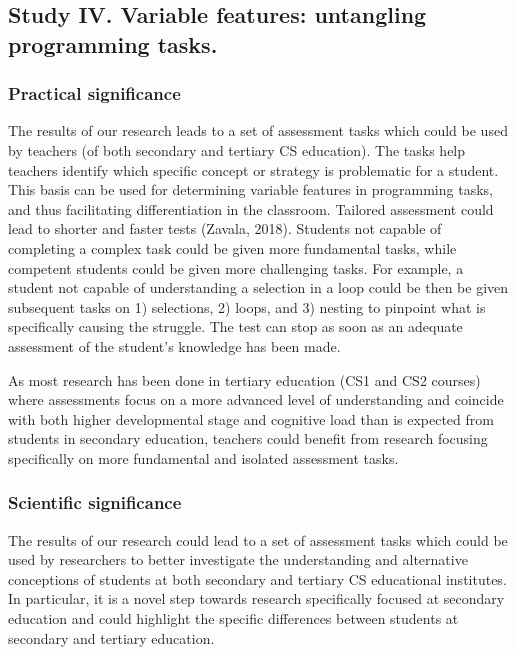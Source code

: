 \subsection{Study IV. Variable features: untangling programming tasks.}
\subsubsection*{Practical significance}

The results of our research leads to a set of assessment tasks which could be used by teachers (of both secondary and tertiary CS education). The tasks help teachers identify which specific concept or strategy is problematic for a student. This basis can be used for determining variable features in programming tasks, and thus facilitating differentiation in the classroom. Tailored assessment could lead to shorter and faster tests (Zavala, 2018). Students not capable of completing a complex task could be given more fundamental tasks, while competent students could be given more challenging tasks. For example, a student not capable of understanding a selection in a loop could be then be given subsequent tasks on 1) selections, 2) loops, and 3) nesting to pinpoint what is specifically causing the struggle. The test can stop as soon as an adequate assessment of the student’s knowledge has been made.

As most research has been done in tertiary education (CS1 and CS2 courses) where assessments focus on a more advanced level of understanding and coincide with both higher developmental stage and cognitive load than is expected from students in secondary education, teachers could benefit from research focusing specifically on more fundamental and isolated assessment tasks.




\subsubsection*{Scientific significance}
The results of our research could lead to a set of assessment tasks which could be used by researchers to better investigate the understanding and alternative conceptions of students at both secondary and tertiary CS educational institutes. In particular, it is a novel step towards research specifically focused at secondary education and could highlight the specific differences between students at secondary and tertiary education.

